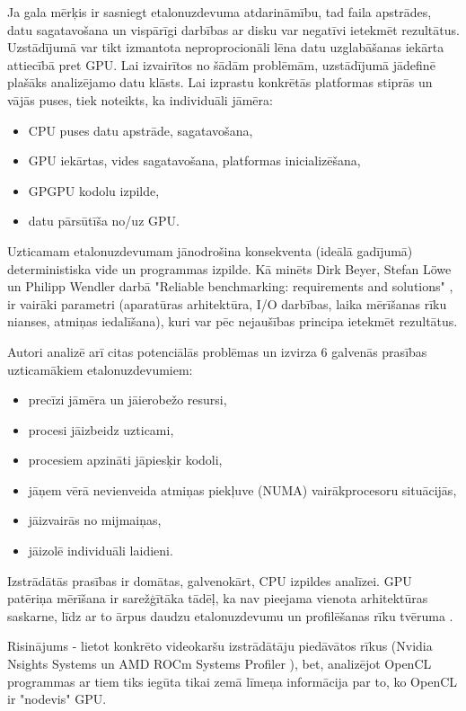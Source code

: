 Ja gala mērķis ir sasniegt etalonuzdevuma atdarināmību, tad faila apstrādes,
datu sagatavošana un vispārīgi darbības ar disku var negatīvi ietekmēt
rezultātus. Uzstādījumā var tikt izmantota neproprocionāli lēna datu
uzglabāšanas iekārta attiecībā pret GPU. Lai izvairītos no šādām problēmām,
uzstādījumā jādefinē plašāks analizējamo datu klāsts. Lai izprastu konkrētās
platformas stiprās un vājās puses, tiek noteikts, ka individuāli jāmēra:
\begin{itemize}
    \item CPU puses datu apstrāde, sagatavošana,
    \item GPU iekārtas, vides sagatavošana, platformas inicializēšana,
    \item GPGPU kodolu izpilde,
    \item datu pārsūtīša no/uz GPU.
\end{itemize}

Uzticamam etalonuzdevumam jānodrošina konsekventa (ideālā gadījumā) 
deterministiska vide un programmas izpilde. Kā minēts Dirk Beyer, Stefan Löwe
un Philipp Wendler darbā "Reliable benchmarking: requirements and solutions" 
\cite{reliable-benchmarking}, ir vairāki parametri (aparatūras arhitektūra, I/O
darbības, laika mērīšanas rīku nianses, atmiņas iedalīšana), kuri var pēc
nejaušības principa ietekmēt rezultātus.

Autori analizē arī citas potenciālās problēmas un izvirza 6 galvenās prasības
uzticamākiem etalonuzdevumiem: \cite{reliable-benchmarking}
\begin{itemize}
    \item precīzi jāmēra un jāierobežo resursi,
    \item procesi jāizbeidz uzticami,
    \item procesiem apzināti jāpiesķir kodoli,
    \item jāņem vērā nevienveida atmiņas piekļuve (NUMA) vairākprocesoru
        situācijās,
    \item jāizvairās no mijmaiņas,
    \item jāizolē individuāli laidieni.
\end{itemize}

Izstrādātās prasības ir domātas, galvenokārt, CPU izpildes analīzei. GPU
patēriņa mērīšana ir sarežģītāka tādēļ, ka nav pieejama vienota
arhitektūras saskarne, līdz ar to ārpus daudzu etalonuzdevumu un profilēšanas
rīku tvēruma \cite{reliable-benchmarking}.

Risinājums - lietot konkrēto videokaršu izstrādātāju piedāvātos rīkus 
(Nvidia Nsights Systems \cite{nvidia-nsights} un AMD ROCm Systems
Profiler \cite{rocm-profiler}), bet, analizējot OpenCL programmas ar tiem
tiks iegūta tikai zemā līmeņa informācija par to, ko OpenCL ir "nodevis" GPU.

